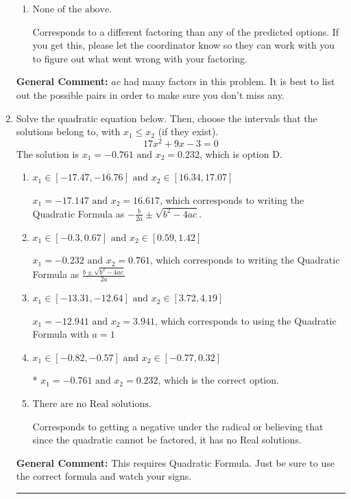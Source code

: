 \documentclass{extbook}[14pt]
\newcommand{\litem}[1]{\item #1

\rule{\textwidth}{0.4pt}}
\begin{document}
\begin{enumerate}
{\begin{enumerate}[label=\Alph*.]
* $(6x -5)(9x -2)$, which is the correct option.
\item \( \text{None of the above.} \)

 Corresponds to a different factoring than any of the predicted options. If you get this, please let the coordinator know so they can work with you to figure out what went wrong with your factoring.
\end{enumerate}

\textbf{General Comment:} $ac$ had many factors in this problem. It is best to list out the possible pairs in order to make sure you don't miss any.
}
\litem{
Solve the quadratic equation below. Then, choose the intervals that the solutions belong to, with $x_1 \leq x_2$ (if they exist).
\[ 17x^{2} +9 x -3 = 0 \]The solution is \( x_1 = -0.761 \text{ and } x_2 = 0.232 \), which is option D.\begin{enumerate}[label=\Alph*.]
\item \( x_1 \in [-17.47, -16.76] \text{ and } x_2 \in [16.34, 17.07] \)

 $x_1 = -17.147 \text{ and } x_2 = 16.617$, which corresponds to writing the Quadratic Formula as $-\frac{b}{2a} \pm \sqrt{b^2 - 4ac}$.
\item \( x_1 \in [-0.3, 0.67] \text{ and } x_2 \in [0.59, 1.42] \)

 $x_1 = -0.232 \text{ and } x_2 = 0.761$, which corresponds to writing the Quadratic Formula as $\frac{b \pm \sqrt{b^2 - 4ac}}{2a}$
\item \( x_1 \in [-13.31, -12.64] \text{ and } x_2 \in [3.72, 4.19] \)

 $x_1 = -12.941 \text{ and } x_2 = 3.941$, which corresponds to using the Quadratic Formula with $a=1$
\item \( x_1 \in [-0.82, -0.57] \text{ and } x_2 \in [-0.77, 0.32] \)

* $x_1 = -0.761 \text{ and } x_2 = 0.232$, which is the correct option.
\item \( \text{There are no Real solutions.} \)

Corresponds to getting a negative under the radical or believing that since the quadratic cannot be factored, it has no Real solutions.
\end{enumerate}

\textbf{General Comment:} This requires Quadratic Formula. Just be sure to use the correct formula and watch your signs.
}
\end{enumerate}
\end{document}

